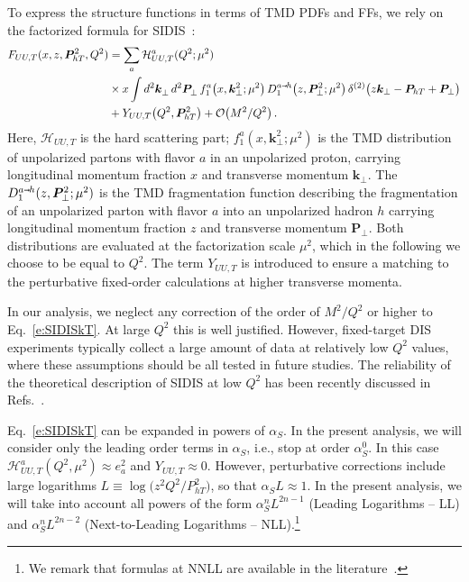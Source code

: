 \documentclass[aps,preprintnumbers,showpacs,nofootinbib,superscriptaddress,floatfix]{revtex4}
\newcommand{\smarrow}{\mbox{\raisebox{-4.5pt}[0pt][0pt]{$\hspace{-1pt} 
		\vec{\phantom{v}}$}}}
\newcommand{\T}{\perp}
\newcommand{\Tperp}{T}
\begin{document}
To express the structure functions in terms of TMD PDFs and FFs, 
we rely on the factorized formula 
for SIDIS~\cite{Collins:1981uk,Collins:1984kg,Ji:2002aa,Ji:2004wu,%
Collins:2011zzd,Aybat:2011zv,GarciaEchevarria:2011rb,Echevarria:2012pw,%
Collins:2012uy}:  
\begin{align}
\label{e:SIDISkT}
   F_{UU,T}(x,z, \bm{P}_{h \Tperp}^2, Q^2) &= \sum_a \mathcal{H}_{UU,T}^{a}(Q^2;\mu^2) \\ 
      &\times x \int d^2\bm{k}_\T^{} \, d^2\bm{P}_\T^{} \,  f_1^a\big(x,\bm{k}_{\T}^2; \mu^2 \big) \, D_{1}^{a\smarrow h}\big(z,\bm{P}_{\T}^2; \mu^2 \big) \,
      \delta^{(2)} \big(z {\bm k}_{\T} - {\bm P}_{h \Tperp} + {\bm P}_{\T}\big)
\nonumber\\&
\nonumber + Y_{UU,T}\big(Q^2, \bm{P}_{h\Tperp}^2\big) + \mathcal{O}\big(M^2/Q^2\big) \, .
\end{align} 
Here, $\mathcal{H}_{UU,T}$ is the hard scattering part; $f_1^a(x,\bm{k}_{\T}^2;
\mu^2)$ is the TMD distribution of unpolarized partons with flavor $a$ in an unpolarized
proton, carrying longitudinal momentum fraction $x$ and transverse momentum
$\bm{k}_\T$.  The $D_1^{a\smarrow h}(z, \bm{P}_{\T}^2;
\mu^2)$ is the TMD fragmentation function describing the fragmentation of an unpolarized parton with flavor $a$ into
an unpolarized hadron $h$ carrying longitudinal momentum fraction $z$ and
transverse momentum 
$\bm{P}_\T$. Both distributions are evaluated at the factorization 
scale $\mu^2$, which in the following we
choose to be equal to $Q^2$. 
The term $Y_{UU,T}$ is introduced to ensure a matching
to the perturbative fixed-order calculations at higher transverse momenta. 

In our analysis, we neglect any correction of the order of $M^2/Q^2$ or higher
to  Eq.~\eqref{e:SIDISkT}.
At large $Q^2$ this is well justified. 
However, fixed-target DIS experiments typically 
collect a large amount of data
at relatively low $Q^2$ values, where these assumptions
should be all tested in future studies. The reliability
of the theoretical description of SIDIS at low $Q^2$ has been recently
discussed in Refs.~\cite{Boglione:2016bph,Moffat:2017sha}.
 
Eq.~\eqref{e:SIDISkT} can be expanded in powers
of $\alpha_S$. In the present analysis, we 
will consider only the leading order terms in $\alpha_S$, i.e., stop at
order $\alpha_S^0$. In this case 
$\mathcal{H}^a_{UU,T} (Q^2, \mu^2) \approx e_a^2$
and $Y_{UU,T}\approx 0$. 
However, perturbative corrections include large logarithms $L \equiv
\log\big(z^2 Q^2/P_{hT}^2\big)$, so that $\alpha_S L \approx 1$.
In the present analysis, we will take into account all 
powers of the form $\alpha_S^n L^{2n-1}$ (Leading Logarithms -- LL) 
and 
$\alpha_S^n L^{2n-2} $ (Next-to-Leading Logarithms -- NLL).\footnote{We
  remark that formulas at NNLL are available in the
  literature~\cite{Echevarria:2016scs}.} 
\end{document}
